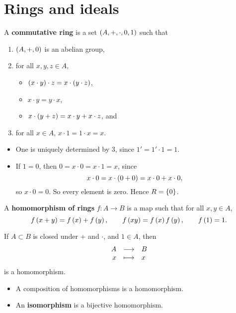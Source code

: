 \pagebreak

\section{Rings and ideals}

\begin{definition}
A \textbf{commutative ring} is a set $ \br{A, +, \cdot, 0, 1} $ such that
\begin{enumerate}
\item $ \br{A, +, 0} $ is an abelian group,
\item for all $ x, y, z \in A $,
\begin{itemize}
\item $ \br{x \cdot y} \cdot z = x \cdot \br{y \cdot z} $,
\item $ x \cdot y = y \cdot x $,
\item $ x \cdot \br{y + z} = x \cdot y + x \cdot z $, and
\end{itemize}
\item for all $ x \in A $, $ x \cdot 1 = 1 \cdot x = x $.
\end{enumerate}
\end{definition}

\begin{remark}
\hfill
\begin{itemize}
\item One is uniquely determined by $ 3 $, since $ 1' = 1' \cdot 1 = 1 $.
\item If $ 1 = 0 $, then $ 0 = x \cdot 0 = x \cdot 1 = x $, since
$$ x \cdot 0 = x \cdot \br{0 + 0} = x \cdot 0 + x \cdot 0, $$
so $ x \cdot 0 = 0 $. So every element is zero. Hence $ R = \cbr{0} $.
\end{itemize}
\end{remark}

\begin{definition}
A \textbf{homomorphism of rings} $ f : A \to B $ is a map such that for all $ x, y \in A $,
$$ f\br{x + y} = f\br{x} + f\br{y}, \qquad f\br{xy} = f\br{x}f\br{y}, \qquad f\br{1} = 1. $$
\end{definition}

\begin{example*}
If $ A \subset B $ is closed under $ + $ and $ \cdot $, and $ 1 \in A $, then
$$ \function{A}{B}{x}{x} $$
is a homomorphism.
\end{example*}

\begin{remark}
\hfill
\begin{itemize}
\item A composition of homomorphisms is a homomorphism.
\item An \textbf{isomorphism} is a bijective homomorphism.
\end{itemize}
\end{remark}

